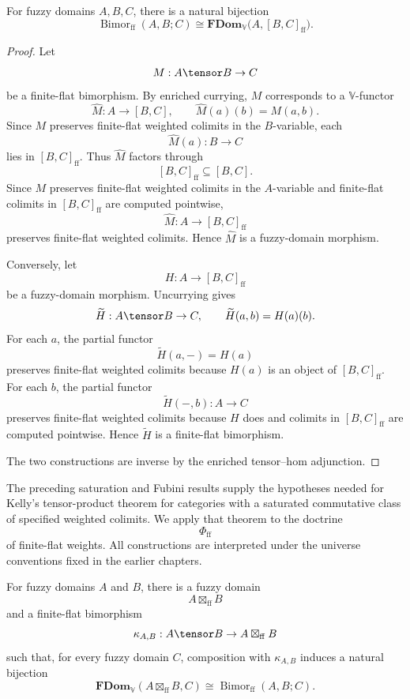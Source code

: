 \begin{proposition}
\label{prop:currying-bimorphisms-rewrite}
For fuzzy domains \(A,B,C\), there is a natural bijection
\[
    \operatorname{Bimor}_{\mathrm{ff}}(A,B;C)
    \cong
    \mathbf{FDom}_{\mathbb V}
    \bigl(A,[B,C]_{\mathrm{ff}}\bigr).
\]
\end{proposition}

\begin{proof}
Let
\[
    M:A\tensor B\to C
\]
be a finite-flat bimorphism.  By enriched currying, \(M\) corresponds to a
\(\mathbb V\)-functor
\[
    \widehat M:A\to[B,C],
    \qquad
    \widehat M(a)(b)=M(a,b).
\]
Since \(M\) preserves finite-flat weighted colimits in the \(B\)-variable, each
\[
    \widehat M(a):B\to C
\]
lies in \([B,C]_{\mathrm{ff}}\).  Thus \(\widehat M\) factors through
\[
    [B,C]_{\mathrm{ff}}\subseteq[B,C].
\]
Since \(M\) preserves finite-flat weighted colimits in the \(A\)-variable and
finite-flat colimits in \([B,C]_{\mathrm{ff}}\) are computed pointwise,
\[
    \widehat M:A\to[B,C]_{\mathrm{ff}}
\]
preserves finite-flat weighted colimits.  Hence \(\widehat M\) is a
fuzzy-domain morphism.

Conversely, let
\[
    H:A\to[B,C]_{\mathrm{ff}}
\]
be a fuzzy-domain morphism.  Uncurrying gives
\[
    \widetilde H:A\tensor B\to C,
    \qquad
    \widetilde H(a,b)=H(a)(b).
\]
For each \(a\), the partial functor
\[
    \widetilde H(a,-)=H(a)
\]
preserves finite-flat weighted colimits because \(H(a)\) is an object of
\([B,C]_{\mathrm{ff}}\).  For each \(b\), the partial functor
\[
    \widetilde H(-,b):A\to C
\]
preserves finite-flat weighted colimits because \(H\) does and colimits in
\([B,C]_{\mathrm{ff}}\) are computed pointwise.  Hence \(\widetilde H\) is a
finite-flat bimorphism.

The two constructions are inverse by the enriched tensor--hom adjunction.
\end{proof}

The preceding saturation and Fubini results supply the hypotheses needed for
Kelly's tensor-product theorem for categories with a saturated commutative class
of specified weighted colimits.  We apply that theorem to the doctrine
\[
    \Phi_{\mathrm{ff}}
\]
of finite-flat weights.  All constructions are interpreted under the universe
conventions fixed in the earlier chapters.

\begin{theorem}
\label{thm:kelly-tensor-product-fdom-rewrite}
For fuzzy domains \(A\) and \(B\), there is a fuzzy domain
\[
    A\boxtimes_{\mathrm{ff}}B
\]
and a finite-flat bimorphism
\[
    \kappa_{A,B}:A\tensor B\to A\boxtimes_{\mathrm{ff}}B
\]
such that, for every fuzzy domain \(C\), composition with \(\kappa_{A,B}\)
induces a natural bijection
\[
    \mathbf{FDom}_{\mathbb V}
    (A\boxtimes_{\mathrm{ff}}B,C)
    \cong
    \operatorname{Bimor}_{\mathrm{ff}}(A,B;C).
\]
\end{theorem}

